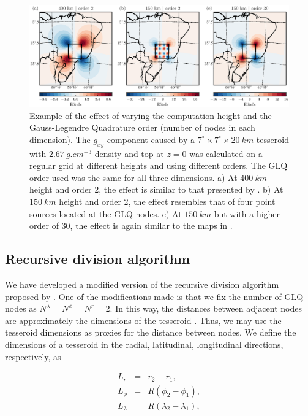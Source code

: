 \begin{figure}
    \centering
    \includegraphics[width=\textwidth]{figs/vary-height-and-order}
    \caption{
        Example of the effect of varying
        the computation height and the Gauss-Legendre Quadrature order
        (number of nodes in each dimension).
        The $g_{xy}$ component caused by a
        $7^\circ \times 7^\circ \times 20\ km$ tesseroid
        with $2.67\ g.cm^{-3}$ density
        and top at $z=0$
        was calculated on a regular grid
        at different heights and using different orders.
        The GLQ order used was the same for all three dimensions.
        a) At $400\ km$ height and order 2, the effect is similar to that
        presented by \citet{Asgharzadeh2007}. b) At $150\ km$ height and order
        2, the effect resembles that of four point sources located at the GLQ
        nodes. c) At $150\ km$ but with a higher order of 30, the effect is
        again similar to the maps in \citet{Asgharzadeh2007}.
    }
    \label{fig:sample}
\end{figure}


\subsection{Recursive division algorithm}

We have developed a modified version
of the recursive division algorithm proposed by \citet{Li2011}.
One of the modifications made is that
we fix the number of GLQ nodes as
$N^\lambda=N^\phi=N^r=2$.
In this way, the distances between adjacent nodes
are approximately the dimensions of the tesseroid
\citep[see][]{Wild-Pfeiffer2008}.
Thus, we may use the tesseroid dimensions
as proxies for the distance between nodes.
We define the dimensions of a tesseroid
in the radial, latitudinal, longitudinal directions, respectively,
as

\begin{eqnarray}
    L_r &=& r_2 - r_1,\\
    L_\phi &=& R(\phi_2 - \phi_1),\\
    L_\lambda &=& R(\lambda_2 - \lambda_1),
\end{eqnarray}

